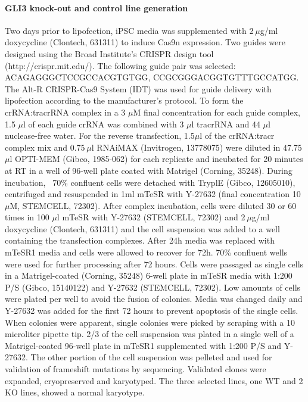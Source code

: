 \paragraph{GLI3 knock-out and control line generation}
Two days prior to lipofection, iPSC media was supplemented with 2 $\mu$g/ml doxycycline (Clontech, 631311) to induce Cas9n expression. Two guides were designed using the Broad Institute’s CRISPR design tool (http://crispr.mit.edu/). The following guide pair was selected: ACAGAGGGCTCCGCCACGTGTGG, CCGCGGGACGGTGTTTGCCATGG. The Alt-R CRISPR-Cas9 System (IDT) was used for guide delivery with lipofection according to the manufacturer's protocol. To form the crRNA:tracrRNA complex in a 3 $\mu$M final concentration for each guide complex, 1.5 $\mu$l of each guide crRNA was combined with 3 $\mu$l tracrRNA and 44 $\mu$l nuclease-free water. For the reverse transfection, 1.5$\mu$l of the crRNA:tracr complex mix and  0.75 $\mu$l RNAiMAX (Invitrogen, 13778075) were diluted in 47.75 $\mu$l OPTI-MEM (Gibco, 1985-062) for each replicate and incubated for 20 minutes at RT in a well of 96-well plate coated with Matrigel (Corning, 35248). During incubation, ~70\% confluent cells were detached with TryplE (Gibco, 12605010), centrifuged and resuspended in 1ml mTeSR with Y-27632 (final concentration 10$\mu$M, STEMCELL, 72302). After complex incubation, cells were diluted 30 or 60 times in 100 $\mu$l mTeSR with  Y-27632 (STEMCELL, 72302) and 2 $\mu$g/ml doxycycline (Clontech, 631311) and the cell suspension was added to a well containing the transfection complexes. After 24h media was replaced with mTeSR1 media and cells were allowed to recover for 72h. 70\% confluent wells were used for further processing after 72 hours. Cells were passaged as single cells in a Matrigel-coated (Corning, 35248) 6-well plate in mTeSR media with 1:200 P/S (Gibco, 15140122) and Y-27632 (STEMCELL, 72302). Low amounts of cells were plated per well to avoid the fusion of colonies. Media was changed daily and Y-27632 was added for the first 72 hours to prevent apoptosis of the single cells. When colonies were apparent, single colonies were picked by scraping with a 10 microliter pipette tip. 2/3 of the cell suspension was plated in a single well of a Matrigel-coated 96-well plate in mTeSR1 supplemented with 1:200 P/S and Y-27632. The other portion of the cell suspension was pelleted and used for validation of frameshift mutations by sequencing. Validated clones were expanded, cryopreserved and karyotyped. The three selected lines, one WT and 2 KO lines, showed a normal karyotype.
 
